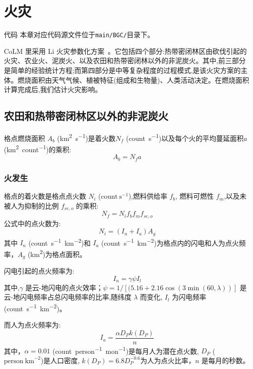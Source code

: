\chapter{火灾}\label{ch:火灾}
\begin{mymdframed}{代码}
本章对应代码源文件位于\texttt{main/BGC/}目录下。
\end{mymdframed}

CoLM 里采用 Li 火灾参数化方案~\citep{LiF2012,LiF2013,LiF2017,LiF2019}。它包括四个部分:热带密闭林区由砍伐引起的火灾、农业火、泥炭火、以及农田和热带密闭林以外的非泥炭火。其中,前三部分是简单的经验统计方程;而第四部分是中等复杂程度的过程模式,是该火灾方案的主体。燃烧面积由天气气候、植被特征(组成和生物量)、人类活动决定。在燃烧面积计算完成后,我们估计火灾影响。

\section{农田和热带密闭林区以外的非泥炭火}
格点燃烧面积 $A_b$ (\unit{km^2.s^{-1}})是着火数$N_f$ (\unit{count.s^{-1}})以及每个火的平均蔓延面积$a$ (\unit{km^2.count^{-1}})的乘积:
\begin{equation}
A_b = N_f a
\end{equation}

\subsection{火发生}
格点的着火数是格点点火数 $N_i$ ($\text{count}~\text{s}^{-1}$),燃料供给率 $f_b$, 燃料可燃性 $f_m$,以及未被人为抑制的比例 $f_{se,o}$ 的乘积:  
\begin{equation}
N_f = N_i f_b f_m f_{se,o} 
\end{equation}
%
公式中的点火数为:
\begin{equation}
N_{i}=\left(I_{n}+I_{a}\right) A_{g}
\end{equation}
%
其中 $I_n$ (\unit{count.s^{-1}.km^{-2}})和 $I_a$ (\unit{count.s^{-1}.km^{-2}})为格点内的闪电和人为点火频率，$A_g$ (\unit{km^2})为格点面积。

闪电引起的点火频率为: 
\begin{equation}
I_{n}=\gamma \psi I_{l}
\end{equation}
其中,$\gamma$ 是云-地闪电的点火效率；$\psi=1/\left[(5.16+2.16\cos(3\min(60,\lambda))\right]$ 是云-地闪电频率占总闪电频率的比率,随纬度 $\lambda$ 而变化, $I_{l}$ 为闪电频率 (\unit{count.s^{-1}.km^{-2}})。

而人为点火频率为:  
\begin{equation}
I_{a}=\frac{\alpha D_{P} k\left(D_{P}\right)}{n}
\end{equation}
其中，$\alpha=0.01$ (\unit{count.person^{-1}.mon^{-1}})是每月人为潜在点火数, $D_P$ ($\text{person}~\text{km}^{-2}$)是人口密度, $k\left(D_{P}\right)=6.8D_P^{-0.6}$为人为点火比率，$n$ 是每月的秒数。


